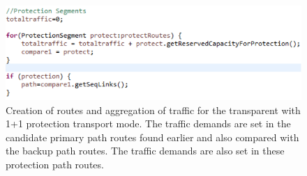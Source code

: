 \begin{figure}[H]
\centering
\includegraphics[width=14cm]{sdf/heuristic/transparent_protection/figures/grooming_transparent_protec4}
\caption{Creation of routes and aggregation of traffic for the transparent with 1+1 protection transport mode. The traffic demands are set in the candidate primary path routes found earlier and also compared with the backup path routes. The traffic demands are also set in these protection path routes.}
\label{grooming_transparent_protec4}
\end{figure}

